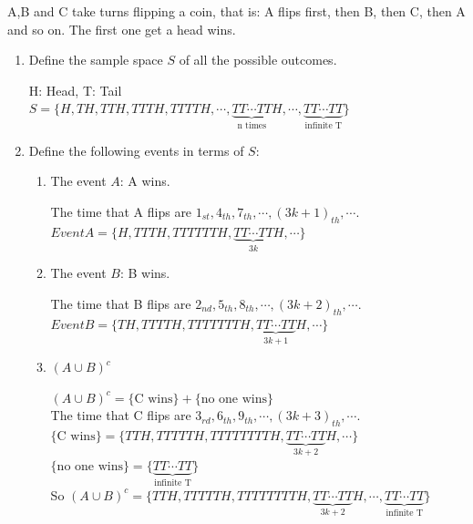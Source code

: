 \documentclass[12pt,thmsa]{article}
\begin{document}
A,B and C take turns flipping a coin, that is: A flips first, then B, then C, then A and so on. The first one get a head wins.
\begin{enumerate}
  \item Define the sample space $S$ of all the possible outcomes.

H: Head, T: Tail\\
$S = \{H,TH, TTH, TTTH, TTTTH, \cdots ,\underbrace{TT\cdots TT}_{\text{n times}}H, \cdots, \underbrace{TT\cdots TT}_{\text{infinite T}}\}$
  \item Define the following events in terms of $S$:
\begin{enumerate}
  \item The event $A$: A wins.

The time that A flips are $1_{st}, 4_{th},7_{th}, \cdots, {(3k+1)}_{th}, \cdots$.\\
$Event A = \{H, TTTH, TTTTTTH, \underbrace{TT\cdots TT}_{3k}H, \cdots \}$
  \item The event $B$: B wins.

The time that B flips are $2_{nd}, 5_{th},8_{th}, \cdots, {(3k +2)}_{th}, \cdots$.\\
$Event B = \{TH, TTTTH, TTTTTTTH, \underbrace{TT\cdots TT}_{3k+1}H, \cdots \}$
  \item $(A \cup B)^c$

$(A \cup B)^c=\{\text{C wins}\}+ \{\text{no one wins}\}$\\
The time that C flips are $3_{rd}, 6_{th},9_{th}, \cdots, {(3k+3)}_{th}, \cdots$.\\
$\{\text{C wins}\} = \{TTH,TTTTTH, TTTTTTTTH, \underbrace{TT\cdots TT}_{3k+2}H, \cdots \}$\\
 $\{\text{no one wins}\} = \{ \underbrace{TT\cdots TT}_{\text{infinite T}}\}$ \\
So $(A \cup B)^c=\{TTH, TTTTTH, TTTTTTTTH, \underbrace{TT\cdots TT}_{3k+2}H, \cdots,\underbrace{TT\cdots TT}_{\text{infinite T}} \}$

\end{enumerate}
\end{enumerate}
\end{document}
